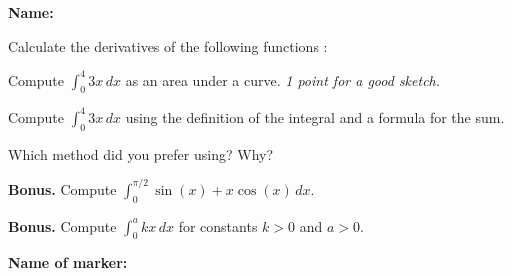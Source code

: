 \documentclass[12pt]{exam}
\begin{document}
\textbf{Name:} \dotfill

\begin{questions}

\question[3] 
Calculate the derivatives of the following functions :  
 \vspace{2mm}

\question[3]
Compute $\displaystyle \int_{0}^{4} 3x \, dx$ as an area under a curve.  \hfill \emph{1 point for a good sketch.}
\vspace{6cm}

\question[3]
Compute $\displaystyle \int_{0}^{4} 3x \, dx$  using the definition of the integral and a formula for the sum.
\fillwithdottedlines{6cm}

\question
{}

\question[0] Which method did you prefer using? Why? \dotfill
\fillwithdottedlines{10mm}

\question[0] \textbf{Bonus.} Compute $\displaystyle \int_{0}^{\pi/2}  \sin(x) + x \cos(x) \, dx.$
\vfill


\question[0] \textbf{Bonus.}  
Compute $\displaystyle \int_{0}^{a} kx \, dx$ for constants $k>0$ and $a>0$.
\vfill

\end{questions}


\begin{tcolorbox}

\textbf{Name of marker:}

\begin{center}
\gradetable[h][questions]
\end{center}

\end{tcolorbox}
\end{document}
